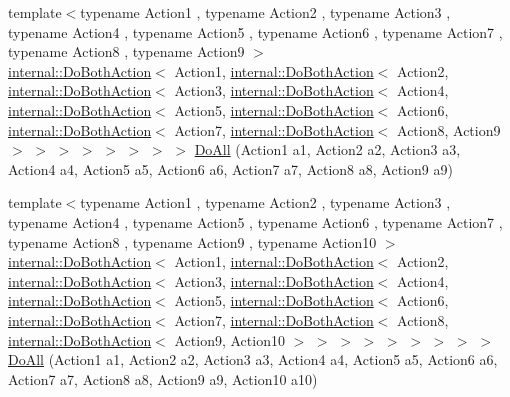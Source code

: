 \begin{DoxyCompactItemize}
{\footnotesize template$<$typename Action1 , typename Action2 , typename Action3 , typename Action4 , typename Action5 , typename Action6 , typename Action7 , typename Action8 , typename Action9 $>$ }\\\hyperlink{classtesting_1_1internal_1_1DoBothAction}{internal\+::\+Do\+Both\+Action}$<$ Action1, \hyperlink{classtesting_1_1internal_1_1DoBothAction}{internal\+::\+Do\+Both\+Action}$<$ Action2, \hyperlink{classtesting_1_1internal_1_1DoBothAction}{internal\+::\+Do\+Both\+Action}$<$ Action3, \hyperlink{classtesting_1_1internal_1_1DoBothAction}{internal\+::\+Do\+Both\+Action}$<$ Action4, \hyperlink{classtesting_1_1internal_1_1DoBothAction}{internal\+::\+Do\+Both\+Action}$<$ Action5, \hyperlink{classtesting_1_1internal_1_1DoBothAction}{internal\+::\+Do\+Both\+Action}$<$ Action6, \hyperlink{classtesting_1_1internal_1_1DoBothAction}{internal\+::\+Do\+Both\+Action}$<$ Action7, \hyperlink{classtesting_1_1internal_1_1DoBothAction}{internal\+::\+Do\+Both\+Action}$<$ Action8, Action9 $>$ $>$ $>$ $>$ $>$ $>$ $>$ $>$ \hyperlink{namespacetesting_a3479e234532d82d0a093f7ffdb3ac254}{Do\+All} (Action1 a1, Action2 a2, Action3 a3, Action4 a4, Action5 a5, Action6 a6, Action7 a7, Action8 a8, Action9 a9)
\item 
{\footnotesize template$<$typename Action1 , typename Action2 , typename Action3 , typename Action4 , typename Action5 , typename Action6 , typename Action7 , typename Action8 , typename Action9 , typename Action10 $>$ }\\\hyperlink{classtesting_1_1internal_1_1DoBothAction}{internal\+::\+Do\+Both\+Action}$<$ Action1, \hyperlink{classtesting_1_1internal_1_1DoBothAction}{internal\+::\+Do\+Both\+Action}$<$ Action2, \hyperlink{classtesting_1_1internal_1_1DoBothAction}{internal\+::\+Do\+Both\+Action}$<$ Action3, \hyperlink{classtesting_1_1internal_1_1DoBothAction}{internal\+::\+Do\+Both\+Action}$<$ Action4, \hyperlink{classtesting_1_1internal_1_1DoBothAction}{internal\+::\+Do\+Both\+Action}$<$ Action5, \hyperlink{classtesting_1_1internal_1_1DoBothAction}{internal\+::\+Do\+Both\+Action}$<$ Action6, \hyperlink{classtesting_1_1internal_1_1DoBothAction}{internal\+::\+Do\+Both\+Action}$<$ Action7, \hyperlink{classtesting_1_1internal_1_1DoBothAction}{internal\+::\+Do\+Both\+Action}$<$ Action8, \hyperlink{classtesting_1_1internal_1_1DoBothAction}{internal\+::\+Do\+Both\+Action}$<$ Action9, Action10 $>$ $>$ $>$ $>$ $>$ $>$ $>$ $>$ $>$ \hyperlink{namespacetesting_a79ac222c485c7aa0a1774bee17dadb10}{Do\+All} (Action1 a1, Action2 a2, Action3 a3, Action4 a4, Action5 a5, Action6 a6, Action7 a7, Action8 a8, Action9 a9, Action10 a10)

\end{DoxyCompactItemize}

